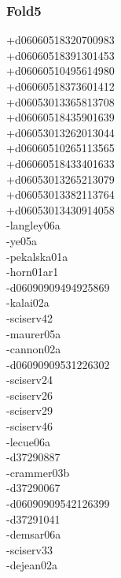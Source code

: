 \begin{multicols}{4}
\subsubsection*{Fold5}
+d06060518320700983\\
+d06060518391301453\\
+d06060510495614980\\
+d06060518373601412\\
+d06053013365813708\\
+d06060518435901639\\
+d06053013262013044\\
+d06060510265113565\\
+d06060518433401633\\
+d06053013265213079\\
+d06053013382113764\\
+d06053013430914058\\
-langley06a\\
-ye05a\\
-pekalska01a\\
-horn01ar1\\
-d06090909494925869\\
-kalai02a\\
-sciserv42\\
-maurer05a\\
-cannon02a\\
-d06090909531226302\\
-sciserv24\\
-sciserv26\\
-sciserv29\\
-sciserv46\\
-lecue06a\\
-d37290887\\
-crammer03b\\
-d37290067\\
-d06090909542126399\\
-d37291041\\
-demsar06a\\
-sciserv33\\
-dejean02a\\

\end{multicols}
